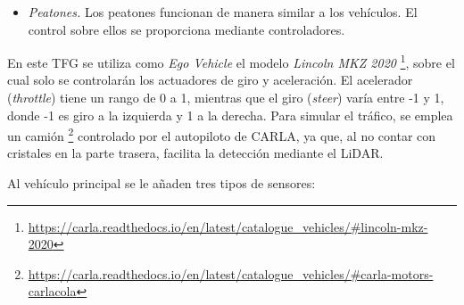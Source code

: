 \begin{itemize}
	\begin{code}[h]
	\begin{lstlisting}[language=python]
	
	vehicle_vp = world.get_blueprint_library().find(vehicle_type)
	vehicle_vp.set_attribute('role_name', 'hero') # Ego vehicle
	ego_vehicle = world.spawn_actor(vehicle_bp, transform)
	ego_vehicle.apply_control(carla.VehicleControl(throttle=0.5, steer=0.1, brake=0.01))

	\end{lstlisting}
	\caption[Configuración de \textit{Ego Vehicle} en CARLA]{Configuración de \textit{Ego Vehicle} en CARLA.}
	\label{cod:ego_carla}
	\end{code}
    \item \textit{Peatones.} Los peatones funcionan de manera similar a los vehículos. El control sobre ellos se proporciona mediante controladores.
\end{itemize}

En este \ac{TFG} se utiliza como \textit{Ego Vehicle} el modelo \textit{Lincoln MKZ 2020} \footnote{\url{https://carla.readthedocs.io/en/latest/catalogue_vehicles/\#lincoln-mkz-2020}}, sobre el cual solo se controlarán los actuadores de giro y aceleración. El acelerador (\textit{throttle}) tiene un rango de 0 a 1, mientras que el giro (\textit{steer}) varía entre -1 y 1, donde -1 es giro a la izquierda y 1 a la derecha. Para simular el tráfico, se emplea un camión \footnote{\url{https://carla.readthedocs.io/en/latest/catalogue_vehicles/\#carla-motors-carlacola}} controlado por el autopiloto de CARLA, ya que, al no contar con cristales en la parte trasera, facilita la detección mediante el \ac{LiDAR}.

Al vehículo principal se le añaden tres tipos de sensores:

